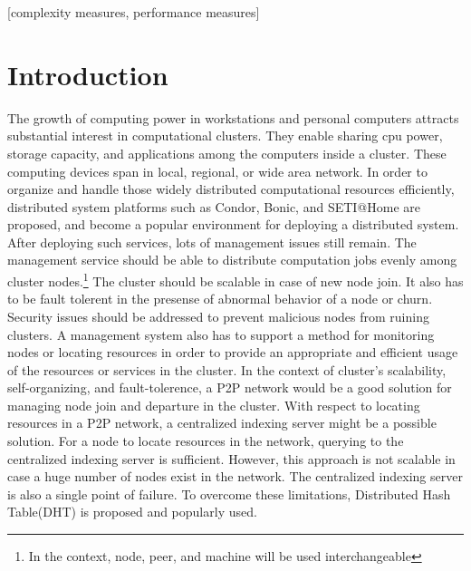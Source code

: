 \documentclass{acm_proc_article-sp}
\begin{document}
[complexity measures, performance measures]



\section{Introduction}
The growth of computing power in workstations and personal computers attracts substantial interest in computational clusters\cite{bonic}\cite{condor}\cite{setiathome}.
They enable sharing cpu power, storage capacity, and applications among the computers inside a cluster. These computing devices span in local, regional, or wide area network.
In order to organize and handle those widely distributed computational resources efficiently, distributed system platforms such as Condor\cite{condor}, Bonic\cite{bonic}, and SETI@Home\cite{setiathome} are proposed, 
and become a popular environment for deploying a distributed system.
After deploying such services, lots of management issues still remain. The management service should be able to distribute computation jobs evenly among cluster nodes.\footnote{In the context, node, peer, and machine will be used interchangeable}
The cluster should be scalable in case of new node join. It also has to be fault tolerent in the presense of abnormal behavior of a node or churn. 
Security issues should be addressed to prevent malicious nodes from ruining clusters.
A management system also has to support a method for monitoring nodes or locating resources in order to provide an appropriate and efficient usage of the resources or services in the cluster.
In the context of cluster's scalability, self-organizing, and fault-tolerence, a P2P network\cite{chord}\cite{pastry}\cite{can}\cite{bamboo} would be a good solution for managing node join and departure in the cluster. 
With respect to locating resources in a P2P network, a centralized indexing server might be a possible solution. 
For a node to locate resources in the network, querying to the centralized indexing server is sufficient. However, this approach is not scalable in case a huge number of nodes exist in the network.
The centralized indexing server is also a single point of failure. To overcome these limitations, Distributed Hash Table(DHT) is proposed and popularly used.
\end{document}
